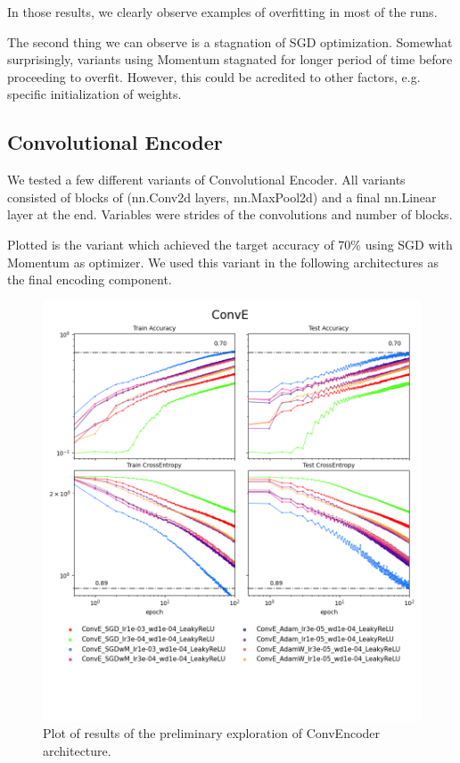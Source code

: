 \documentclass[12pt,a4paper]{article}
\begin{document}
\newpage

In those results, we clearly observe examples of overfitting in
most of the runs.

The second thing we can observe is a stagnation of SGD optimization.
Somewhat surprisingly, variants using Momentum stagnated for longer
period of time before proceeding to overfit.
However, this could be acredited to other factors, e.g.
specific initialization of weights.

\subsection{Convolutional Encoder}

We tested a few different variants of Convolutional Encoder. All variants
consisted of blocks of (nn.Conv2d layers, nn.MaxPool2d) and a final
nn.Linear layer at the end. Variables were strides of the convolutions
and number of blocks.

Plotted is the variant which achieved the target accuracy of 70\%
using SGD with Momentum as optimizer. We used this variant in the
following architectures as the final encoding component.

\begin{figure}[H]
  \includegraphics[width=\textwidth, trim={0, 3.5cm, 0, 0}, clip]{../logsConvE.png}
  \caption{Plot of results of the preliminary exploration of ConvEncoder
  architecture.}
\end{figure}
\end{document}
